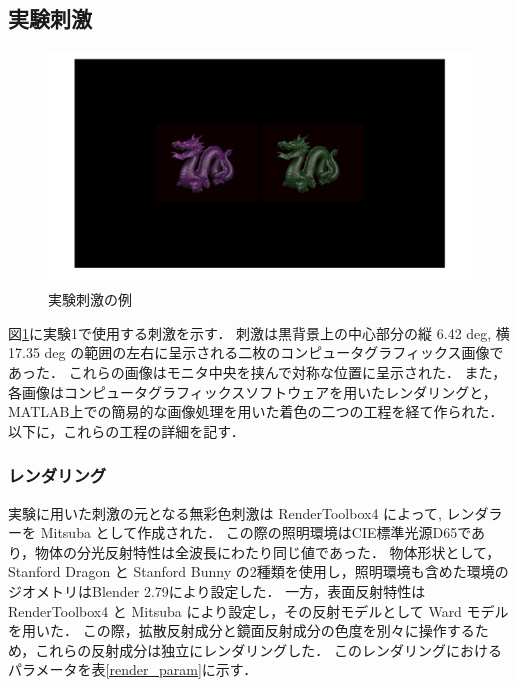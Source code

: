         \subsection{実験刺激}

            \begin{figure}[h]
                \centering
                \includegraphics[width=14.0cm]{./img/ex1_stimuli.png}
                \caption{実験刺激の例}
                \label{ex1_stimuli}
            \end{figure}

            図\ref{ex1_stimuli}に実験1で使用する刺激を示す．
            刺激は黒背景上の中心部分の縦 6.42 deg, 横 17.35 deg の範囲の左右に呈示される二枚のコンピュータグラフィックス画像であった．
            これらの画像はモニタ中央を挟んで対称な位置に呈示された．
            また，各画像はコンピュータグラフィックスソフトウェアを用いたレンダリングと，MATLAB上での簡易的な画像処理を用いた着色の二つの工程を経て作られた．
            以下に，これらの工程の詳細を記す．

            \subsubsection{レンダリング}

                実験に用いた刺激の元となる無彩色刺激は RenderToolbox4 によって, レンダラーを Mitsuba\cite{Mitsuba} として作成された．
                この際の照明環境はCIE標準光源D65であり，物体の分光反射特性は全波長にわたり同じ値であった．
                物体形状として，Stanford Dragon と Stanford Bunny \cite{StanfordModels} の2種類を使用し，照明環境も含めた環境のジオメトリはBlender 2.79により設定した．
                一方，表面反射特性は RenderToolbox4 と Mitsuba により設定し，その反射モデルとして Ward モデル\cite{Ward}を用いた．
                この際，拡散反射成分と鏡面反射成分の色度を別々に操作するため，これらの反射成分は独立にレンダリングした．
                このレンダリングにおけるパラメータを表\ref{render_param}に示す．

